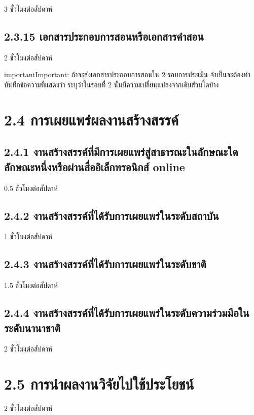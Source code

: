 \documentclass[a4paper,12pt,english]{sphinxmanual}
\begin{document}
3 ชั่วโมงต่อสัปดาห์


\subsection{2.3.15 เอกสารประกอบการสอนหรือเอกสารคำสอน}
\label{\detokenize{2research:id25}}
2 ชั่วโมงต่อสัปดาห์

\begin{sphinxadmonition}{important}{Important:}
ถ้าจะส่งเอกสารประกอบการสอนใน 2 รอบการประเมิน จำเป็นจะต้องทำบันทึกข้อความที่แสดงว่า ระบุว่าในรอบที่ 2 นั้นมีความเปลี่ยนแปลงจากเดิมส่วนใดบ้าง
\end{sphinxadmonition}


\section{2.4 การเผยแพร่ผลงานสร้างสรรค์}
\label{\detokenize{2research:id26}}

\subsection{2.4.1 งานสร้างสรรค์ที่มีการเผยแพร่สู่สาธารณะในลักษณะใดลักษณะหนึ่งหรือผ่านสื่ออิเล็กทรอนิกส์ online}
\label{\detokenize{2research:online}}
0.5 ชั่วโมงต่อสัปดาห์


\subsection{2.4.2 งานสร้างสรรค์ที่ได้รับการเผยแพร่ในระดับสถาบัน}
\label{\detokenize{2research:id27}}
1 ชั่วโมงต่อสัปดาห์


\subsection{2.4.3 งานสร้างสรรค์ที่ได้รับการเผยแพร่ในระดับชาติ}
\label{\detokenize{2research:id28}}
1.5 ชั่วโมงต่อสัปดาห์


\subsection{2.4.4 งานสร้างสรรค์ที่ได้รับการเผยแพร่ในระดับความร่วมมือในระดับนานาชาติ}
\label{\detokenize{2research:id29}}
2 ชั่วโมงต่อสัปดาห์


\section{2.5 การนำผลงานวิจัยไปใช้ประโยชน์}
\label{\detokenize{2research:id30}}
2 ชั่วโมงต่อสัปดาห์
\end{document}
